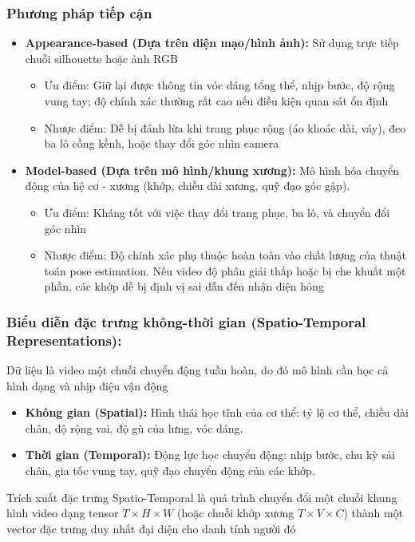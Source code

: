 \subsubsection{Phương pháp tiếp cận}
\begin{itemize}
\item \textbf{Appearance-based (Dựa trên diện mạo/hình ảnh):} Sử dụng trực tiếp chuỗi silhouette hoặc ảnh RGB
    \begin{itemize}
        \item Ưu điểm: Giữ lại được thông tin vóc dáng tổng thể, nhịp bước, độ rộng vung tay; độ chính xác thường rất cao nếu điều kiện quan sát ổn định
        \item Nhược điểm: Dễ bị đánh lừa khi trang phục rộng (áo khoác dài, váy), đeo ba lô cồng kềnh, hoặc thay đổi góc nhìn camera
    \end{itemize}
\item \textbf{Model-based (Dựa trên mô hình/khung xương): }Mô hình hóa chuyển động của hệ cơ - xương (khớp, chiều dài xương, quỹ đạo góc gập).
    \begin{itemize}
        \item Ưu điểm: Kháng tốt với việc thay đổi trang phục, ba lô, và chuyển đổi góc nhìn
        \item Nhược điểm: Độ chính xác phụ thuộc hoàn toàn vào chất lượng của thuật toán pose estimation. Nếu video độ phân giải thấp hoặc bị che khuất một phần, các khớp dễ bị định vị sai dẫn đến nhận diện hỏng
    \end{itemize}
\end{itemize}
    
\subsubsection{Biểu diễn đặc trưng không-thời gian (Spatio-Temporal Representations):} Dữ liệu là video một chuỗi chuyển động tuần hoàn, do đó mô hình cần học cả hình dạng và nhịp điệu vận động
\begin{itemize}
    \item \textbf{Không gian (Spatial):} Hình thái học tĩnh của cơ thể: tỷ lệ cơ thể, chiều dài chân, độ rộng vai, độ gù của lưng, vóc dáng.
    \item \textbf{Thời gian (Temporal):} Động lực học chuyển động: nhịp bước, chu kỳ sải chân, gia tốc vung tay, quỹ đạo chuyển động của các khớp.
\end{itemize}

Trích xuất đặc trưng Spatio-Temporal là quá trình chuyển đổi một chuỗi khung hình video dạng tensor $T \times H \times W$ (hoặc chuỗi khớp xương $T \times V \times C$) thành một vector đặc trưng duy nhất đại diện cho danh tính người đó

